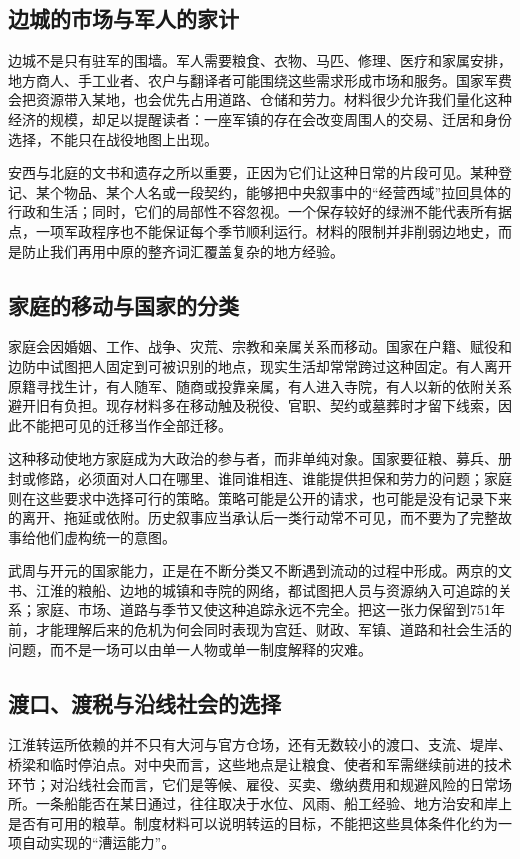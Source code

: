 \subsection{边城的市场与军人的家计}
边城不是只有驻军的围墙。军人需要粮食、衣物、马匹、修理、医疗和家属安排，地方商人、手工业者、农户与翻译者可能围绕这些需求形成市场和服务。国家军费会把资源带入某地，也会优先占用道路、仓储和劳力。材料很少允许我们量化这种经济的规模，却足以提醒读者：一座军镇的存在会改变周围人的交易、迁居和身份选择，不能只在战役地图上出现。

安西与北庭的文书和遗存之所以重要，正因为它们让这种日常的片段可见。某种登记、某个物品、某个人名或一段契约，能够把中央叙事中的“经营西域”拉回具体的行政和生活；同时，它们的局部性不容忽视。一个保存较好的绿洲不能代表所有据点，一项军政程序也不能保证每个季节顺利运行。材料的限制并非削弱边地史，而是防止我们再用中原的整齐词汇覆盖复杂的地方经验。

\subsection{家庭的移动与国家的分类}
家庭会因婚姻、工作、战争、灾荒、宗教和亲属关系而移动。国家在户籍、赋役和边防中试图把人固定到可被识别的地点，现实生活却常常跨过这种固定。有人离开原籍寻找生计，有人随军、随商或投靠亲属，有人进入寺院，有人以新的依附关系避开旧有负担。现存材料多在移动触及税役、官职、契约或墓葬时才留下线索，因此不能把可见的迁移当作全部迁移。

这种移动使地方家庭成为大政治的参与者，而非单纯对象。国家要征粮、募兵、册封或修路，必须面对人口在哪里、谁同谁相连、谁能提供担保和劳力的问题；家庭则在这些要求中选择可行的策略。策略可能是公开的请求，也可能是没有记录下来的离开、拖延或依附。历史叙事应当承认后一类行动常不可见，而不要为了完整故事给他们虚构统一的意图。

武周与开元的国家能力，正是在不断分类又不断遇到流动的过程中形成。两京的文书、江淮的粮船、边地的城镇和寺院的网络，都试图把人员与资源纳入可追踪的关系；家庭、市场、道路与季节又使这种追踪永远不完全。把这一张力保留到751年前，才能理解后来的危机为何会同时表现为宫廷、财政、军镇、道路和社会生活的问题，而不是一场可以由单一人物或单一制度解释的灾难。

\subsection{渡口、渡税与沿线社会的选择}
江淮转运所依赖的并不只有大河与官方仓场，还有无数较小的渡口、支流、堤岸、桥梁和临时停泊点。对中央而言，这些地点是让粮食、使者和军需继续前进的技术环节；对沿线社会而言，它们是等候、雇役、买卖、缴纳费用和规避风险的日常场所。一条船能否在某日通过，往往取决于水位、风雨、船工经验、地方治安和岸上是否有可用的粮草。制度材料可以说明转运的目标，不能把这些具体条件化约为一项自动实现的“漕运能力”。

